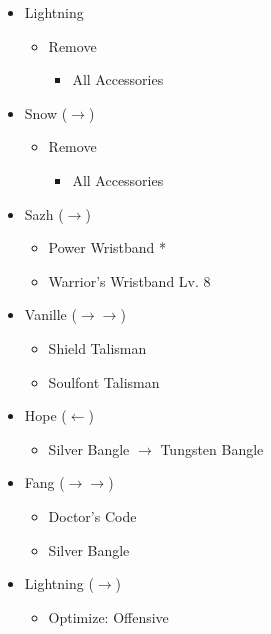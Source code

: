 \begin{paracol}{2}
\begin{menu}
\begin{itemize}
			\equip
			\begin{itemize}
				\item Lightning
				      \begin{itemize}
					      \item Remove
					            \begin{itemize}
						            \item All Accessories
					            \end{itemize}
				      \end{itemize}
				\item Snow ($\rightarrow$)
				      \begin{itemize}
					      \item Remove
					            \begin{itemize}
						            \item All Accessories
					            \end{itemize}
				      \end{itemize}
				\item Sazh ($\rightarrow$)
				      \begin{itemize}
					      \item Power Wristband *
					      \item Warrior's Wristband Lv. 8
				      \end{itemize}
				\item Vanille ($\rightarrow\rightarrow$)
				      \begin{itemize}
					      \item Shield Talisman
					      \item Soulfont Talisman
				      \end{itemize}
				\item Hope ($\leftarrow$)
				      \begin{itemize}
					      \item Silver Bangle $\rightarrow$ Tungsten Bangle
				      \end{itemize}
				\item Fang ($\rightarrow\rightarrow$)
				      \begin{itemize}
					      \item Doctor's Code
					      \item Silver Bangle
				      \end{itemize}
				\item Lightning ($\rightarrow$)
				      \begin{itemize}
					      \item Optimize: Offensive

\end{itemize}
\end{itemize}
\end{itemize}
\end{menu}
\end{paracol}
